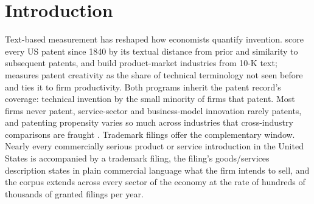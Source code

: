 \documentclass[11pt]{article}
\begin{document}
\begin{abstract}
\noindent Atypicality can be measured on terms or on themes, and the two
disagree. Term atypicality predicts both outcomes negatively ($-0.09$pp of SEC
reporting per standard deviation of the score; $-0.055$ standard deviations
of log patenting); theme atypicality does not predict SEC reporting and
predicts patenting weakly the other way ($+0.012$ standard deviations). The two therefore disagree in sign on both outcomes, which
makes a text measure's sign at the firm level a property of how the text was
counted rather than of the firm. Every estimate is conditional on the office
having granted the mark, because registration is itself selected on language;
without that conditioning the same data support weaker and sometimes opposite
conclusions. Code, panels, and the corpus build are public at
\url{https://github.com/ericsilver/tm-vocabulary}, with a browsable explorer
for the per-theme and per-Nice-class results behind the pooled estimates.
\end{abstract}

\section{Introduction}

Text-based measurement has reshaped how economists quantify invention.
\citet{Kelly2021} score every US patent since 1840 by its textual
distance from prior and similarity to subsequent patents, and
\citet{HobergPhillips2016} build product-market industries from 10-K text;
\citet{Kalyani2024} measures patent creativity as the share of technical
terminology not seen before and ties it to firm productivity. Both
programs inherit the patent record's coverage: technical invention by
the small minority of firms that patent. Most firms never patent,
service-sector and business-model innovation rarely patents, and
patenting propensity varies so much across industries that
cross-industry comparisons are fraught \citep{Graham2013, Dinlersoz2018}.
Trademark filings offer the complementary window. Nearly every
commercially serious product or service introduction in the United
States is accompanied by a trademark filing, the filing's goods/services
description states in plain commercial language what the firm intends to
sell, and the corpus extends across every sector of the economy at the
rate of hundreds of thousands of granted filings per year.
\end{document}
